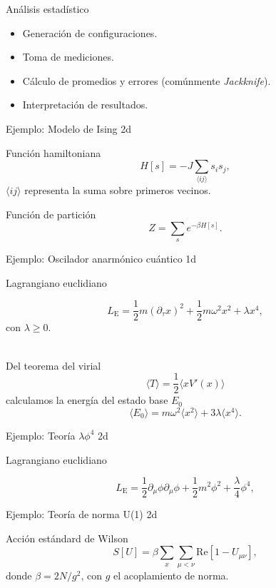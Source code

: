 \documentclass[11pt]{beamer}
\begin{document}
\begin{frame}{Análisis estadístico}

    \begin{itemize}
        \item Generación de configuraciones.
        \item Toma de mediciones.
        \item Cálculo de promedios y errores (comúnmente \emph{Jackknife}).
        \item Interpretación de resultados.
    \end{itemize}

\end{frame}

\begin{frame}{Ejemplo: Modelo de Ising 2d}

Función hamiltoniana
$$ H[s] = -J\sum_{\langle ij \rangle} s_i s_j,$$
$\langle ij \rangle$ representa la suma sobre primeros vecinos.

Función de partición
$$ Z = \sum_s e^{-\beta H[s]}.$$

\end{frame}

\begin{frame}{Ejemplo: Oscilador anarmónico cuántico 1d}

    Lagrangiano euclidiano

    $$ L_{\text{E}} = \frac{1}{2}m\left(\partial_{\tau}x\right)^2 + \frac{1}{2}m\omega^2 x^2 + \lambda x^4,$$
con $\lambda \ge 0$. \\~

Del teorema del virial 
$$\langle T \rangle = \frac{1}{2}\langle x V'(x) \rangle$$
calculamos la energía del estado base $E_0$ 
$$ \langle E_0 \rangle = m\omega^2\langle x^2 \rangle + 3\lambda \langle x^4 \rangle. $$
\end{frame}

\begin{frame}{Ejemplo: Teoría $\lambda \phi^4$ 2d}

Lagrangiano euclidiano

    $$ L_{\text{E}} = \frac{1}{2}\partial_{\mu} \phi \partial_{\mu}\phi + \frac{1}{2}m^2  \phi^2 + \frac{\lambda}{4} \phi^4,$$
\end{frame}

\begin{frame}{Ejemplo: Teoría de norma U(1) 2d}

Acción estándard de Wilson
$$ S[U] = \beta\sum_{x}\sum_{\mu < \nu} \text{Re} \left[1 - U_{\mu\nu} \right], $$
donde $\beta = 2N/g^2$, con $g$ el acoplamiento de norma. 
\end{frame}
\end{document}

